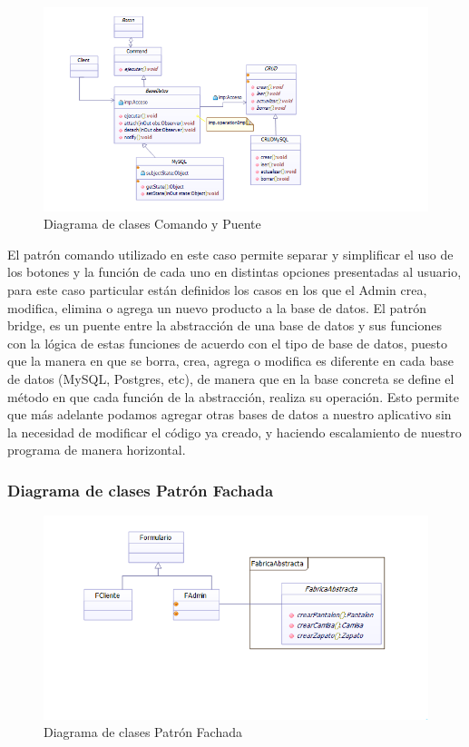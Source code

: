 \begin{figure}[th!]
	\centering
	\includegraphics[width=1.0\linewidth]{arquitectura/imagenes/DiagramaComandoYPuente}
	\caption{Diagrama de clases  Comando y Puente}
\end{figure}



El patrón comando utilizado en este caso permite separar y simplificar el uso de los botones y la función de cada uno en distintas opciones presentadas al usuario, para este caso particular están definidos los casos en los que el Admin crea, modifica, elimina o agrega un nuevo producto a la base de datos.
El patrón bridge, es un puente entre la abstracción de una base de datos y sus funciones con la lógica de estas funciones de acuerdo con el tipo de base de datos, puesto que la manera en que se borra, crea, agrega o modifica es diferente en cada base de datos (MySQL, Postgres, etc), de manera que en la base concreta se define el método en que cada función de la abstracción, realiza su operación. Esto permite que más adelante podamos agregar otras bases de datos a nuestro aplicativo sin la necesidad de modificar el código ya creado, y haciendo escalamiento de nuestro programa de manera horizontal.

\subsubsection*{Diagrama de clases Patrón Fachada}
\begin{figure}[h!]
	\centering
	\includegraphics[width=0.6\linewidth]{arquitectura/imagenes/DiagramaFachada}
	\caption{Diagrama de clases Patrón Fachada}
\end{figure}

